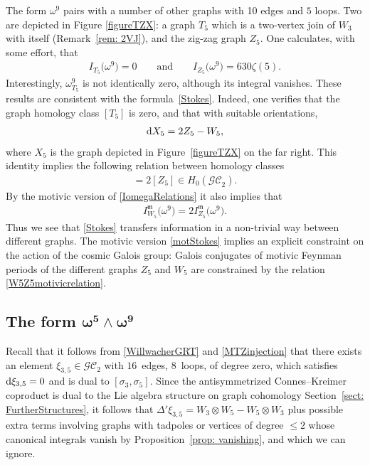 \documentclass[pdftex]{sigma}%
\numberwithin{equation}{section}
\newcommand{\GC}{\mathcal{GC}}
\newcommand{\mm}{\mathfrak{m}}
\newcommand{\0}{\color{blue}{\mathsf{0}}}
\begin{document}
The form $\omega^9$ pairs with a number of other graphs with 10 edges and $5$ loops. Two are depicted in Figure \ref{figureTZX}: a graph $T_5$ which is a two-vertex join of $W_3$ with itself (Remark~\ref{rem: 2VJ}), and the zig-zag graph $Z_5$. One calculates, with some effort, that
\begin{gather*}
I_{T_5} \big(\omega^9\big)= 0 \qquad \text{and} \qquad I_{Z_5} \big(\omega^9\big)= 630 \zeta(5).
\end{gather*}
Interestingly, $\omega^9_{T_5}$ is not identically zero, although its integral vanishes. These results are consistent with the formula~\eqref{Stokes}. Indeed, one verifies that the graph homology class $[T_5]$ is zero, and that with suitable orientations,
\begin{gather*}
 {\rm d} X_5 = 2 Z_5 - W_5,
 \end{gather*}
 where $X_5$ is the graph depicted in Figure~\ref{figureTZX} on the far right. This identity implies the following relation between homology classes
 \begin{gather*}
 [W_5] = 2 [Z_5] \in H_0(\GC_2).
 \end{gather*}
 By the motivic version of \eqref{IomegaRelations} it also implies that
 \begin{gather} \label{W5Z5motivicrelation}
 I^{\mm}_{W_5}\big(\omega^9\big) = 2 I^{\mm}_{Z_5} \big(\omega^9\big).
\end{gather}
Thus we see that \eqref{Stokes} transfers information in a non-trivial way between
different graphs. The motivic version \eqref{motStokes} implies an explicit constraint on the action of the cosmic Galois group: Galois conjugates of motivic Feynman periods of the different graphs $Z_5$ and $W_5$ are constrained by the relation \eqref{W5Z5motivicrelation}.

\subsection[The form omega5 ^ omega9]
{The form $\boldsymbol{\omega^5 \wedge \omega^9}$}\label{sect: omega59}
Recall that it follows from \eqref{WillwacherGRT} and \eqref{MTZinjection} that there exists an element $\xi_{3,5} \in \GC_2$ with $16$~edges, $8$~loops, of degree zero, which satisfies ${\rm d} \xi_{3,5}=0$ and is dual to $[\sigma_3, \sigma_5]$.
Since the antisymmetrized Connes--Kreimer coproduct is dual to the Lie algebra structure on graph cohomology Section~\ref{sect: FurtherStructures}, it follows that $\Delta' \xi_{3,5} = W_3 \otimes W_5 - W_5 \otimes W_3$ plus possible extra terms involving graphs with tadpoles or vertices of degree $\leq 2$ whose canonical integrals vanish by Proposition~\ref{prop: vanishing}, and which we can ignore.
\end{document}
